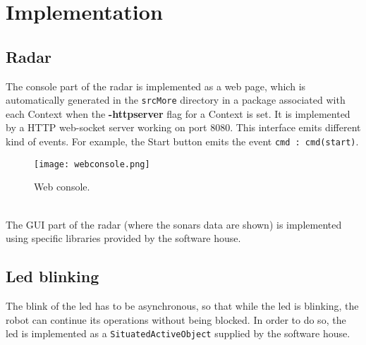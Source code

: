 \section{Implementation}
\subsection{Radar}
The console part of the radar is implemented as a web page, which is automatically generated in the \lstinline[columns=fixed, style=java]{srcMore} directory in a package associated with each Context when the \textbf{-httpserver} flag for a Context is set. It is implemented by a HTTP web-socket server working on port 8080. This interface emits different kind of events. For example, the Start button emits the event  \lstinline[columns=fixed, style=java]{cmd : cmd(start)}.
\begin{figure}[h]
	\centering
	\texttt{[image: webconsole.png]}
	\caption{Web console.}
\end{figure}
\\
The GUI part of the radar (where the sonars data are shown) is implemented using specific libraries provided by the software house.
\subsection{Led blinking}
The blink of the led has to be asynchronous, so that while the led is blinking, the robot can continue its operations without being blocked. In order to do so, the led is implemented as a \lstinline[columns=fixed, style=java]{SituatedActiveObject} supplied by the software house.

